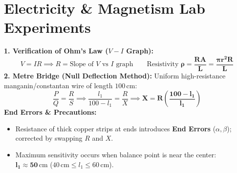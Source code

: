 \documentclass[10pt,a4paper]{article}
\begin{document}
\section{Electricity \& Magnetism Lab Experiments}

\begin{formulabox}
\textbf{1. Verification of Ohm's Law ($V-I$ Graph):}
\begin{equation}
  V = I R \implies R = \text{Slope of } V \text{ vs } I \text{ graph} \qquad \text{Resistivity } \mathbf{\rho = \frac{R A}{L} = \frac{\pi r^2 R}{L}}
\end{equation}
\textbf{2. Metre Bridge (Null Deflection Method):}
Uniform high-resistance manganin/constantan wire of length $100\,\mathrm{cm}$:
\begin{equation}
  \frac{P}{Q} = \frac{R}{S} \implies \frac{l_1}{100 - l_1} = \frac{R}{X} \implies \mathbf{X = R \left(\frac{100 - l_1}{l_1}\right)}
\end{equation}
\textbf{End Errors \& Precautions:}
\begin{itemize}
  \item Resistance of thick copper strips at ends introduces \textbf{End Errors} ($\alpha, \beta$); corrected by swapping $R$ and $X$.
  \item Maximum sensitivity occurs when balance point is near the center: $\mathbf{l_1 \approx 50\,\mathrm{cm}}$ ($40\,\mathrm{cm} \le l_1 \le 60\,\mathrm{cm}$).
\end{itemize}
\end{formulabox}
\end{document}
